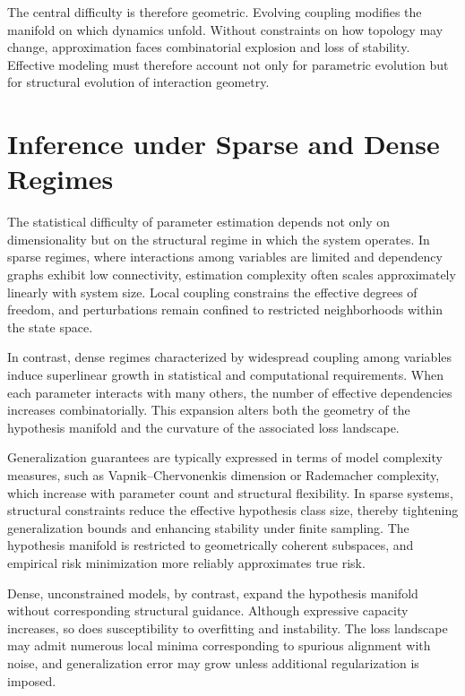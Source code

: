 \documentclass[12pt]{book}
\begin{document}
The central difficulty is therefore geometric. Evolving coupling modifies the manifold on which dynamics unfold. Without constraints on how topology may change, approximation faces combinatorial explosion and loss of stability. Effective modeling must therefore account not only for parametric evolution but for structural evolution of interaction geometry.

\section{Inference under Sparse and Dense Regimes}

The statistical difficulty of parameter estimation depends not only on dimensionality but on the structural regime in which the system operates. In sparse regimes, where interactions among variables are limited and dependency graphs exhibit low connectivity, estimation complexity often scales approximately linearly with system size. Local coupling constrains the effective degrees of freedom, and perturbations remain confined to restricted neighborhoods within the state space.

In contrast, dense regimes characterized by widespread coupling among variables induce superlinear growth in statistical and computational requirements. When each parameter interacts with many others, the number of effective dependencies increases combinatorially. This expansion alters both the geometry of the hypothesis manifold and the curvature of the associated loss landscape.

Generalization guarantees are typically expressed in terms of model complexity measures, such as Vapnik--Chervonenkis dimension or Rademacher complexity, which increase with parameter count and structural flexibility. In sparse systems, structural constraints reduce the effective hypothesis class size, thereby tightening generalization bounds and enhancing stability under finite sampling. The hypothesis manifold is restricted to geometrically coherent subspaces, and empirical risk minimization more reliably approximates true risk.

Dense, unconstrained models, by contrast, expand the hypothesis manifold without corresponding structural guidance. Although expressive capacity increases, so does susceptibility to overfitting and instability. The loss landscape may admit numerous local minima corresponding to spurious alignment with noise, and generalization error may grow unless additional regularization is imposed.
\end{document}
